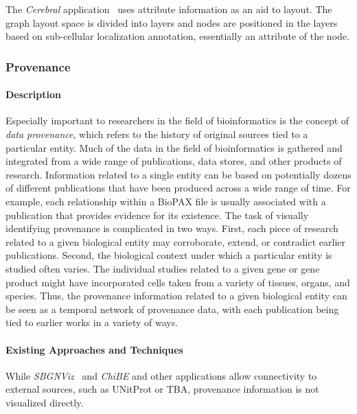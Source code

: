 The \textit{Cerebral} application~\cite{Barsky2008cerebral} uses attribute information as an aid to layout. The graph layout space is divided into layers and nodes are positioned in the layers based  on sub-cellular localization annotation, essentially an attribute of the node.

\subsubsection*{Provenance}

\paragraph*{Description}
Especially important to researchers in the field of bioinformatics is the concept of \textit{data provenance}, which refers to the history of original sources tied to a particular entity.
Much of the data in the field of bioinformatics is gathered and integrated from a wide range of publications, data stores, and other products of research.
Information related to a single entity can be based on potentially dozens of different publications that have been produced across a wide range of time.
For example, each relationship within a BioPAX file is usually associated with a publication that provides evidence for its existence.
The task of visually identifying provenance is complicated in two ways.
First, each piece of research related to a given biological entity may corroborate, extend, or contradict earlier publications.
Second, the biological context under which a particular entity is studied often varies.
The individual studies related to a given gene or gene product might have incorporated cells taken from a variety of tissues, organs, and species.
Thus, the provenance information related to a given biological entity can be seen as a temporal network of provenance data, with each publication being tied to earlier works in a variety of ways.

\paragraph*{Existing Approaches and Techniques}
While \textit{SBGNViz}~\cite{SBGNViz2015} and \textit{ChiBE}\cite{Babur2010chibe} and other applications allow connectivity to external sources, such as UNitProt or TBA, provenance information is not visualized directly.


